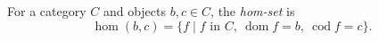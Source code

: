 For a category $C$ and objects $b, c \in C$, the \emph{hom-set} is
$$\hom(b, c) = \{ f \mid f \text{ in } C,\ \operatorname{dom} f = b,\ \operatorname{cod} f = c \}.$$
